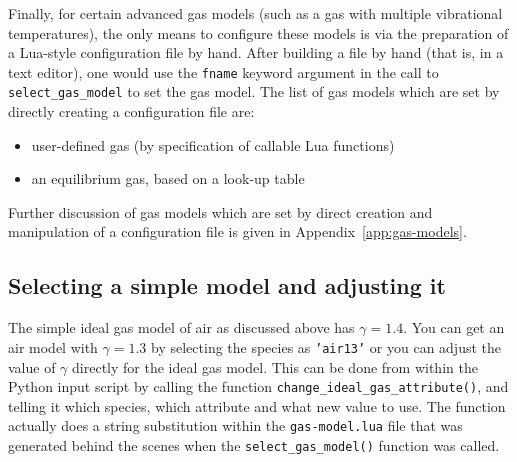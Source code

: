 \medskip
Finally, for certain advanced gas models (such as a gas with multiple vibrational temperatures),
the only means to configure these models is via the preparation of a Lua-style configuration
file by hand.
After building a file by hand (that is, in a text editor), one would use the \texttt{fname} keyword
argument in the call to \texttt{select\_gas\_model} to set the gas model.
The list of gas models which are set by directly creating a configuration file are:
\begin{itemize}
 \item user-defined gas (by specification of callable Lua functions)
 \item an equilibrium gas, based on a look-up table
\end{itemize}
Further discussion of gas models which are set by direct creation
and manipulation of a configuration file is given in Appendix~\ref{app:gas-models}.

\subsection{Selecting a simple model and adjusting it}
The simple ideal gas model of air as discussed above has $\gamma = 1.4$.
You can get an air model with $\gamma = 1.3$ by selecting the species
as \texttt{'air13'} or you can adjust the value of $\gamma$ directly
for the ideal gas model.
This can be done from within the Python input script by calling the function 
\texttt{change\_ideal\_gas\_attribute()},
and telling it which species, which attribute and what new value to use.
The function actually does a string substitution within the \texttt{gas-model.lua} file
that was generated behind the scenes when the \texttt{select\_gas\_model()} function was called.

